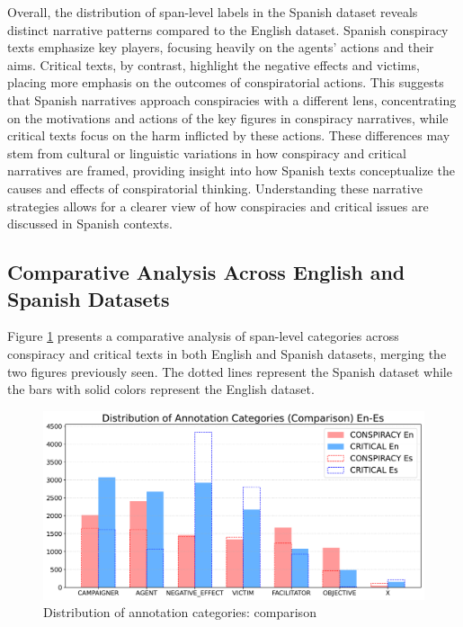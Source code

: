 \documentclass{Configuration_Files/PoliMi3i_thesis}
\begin{document}
Overall, the distribution of span-level labels in the Spanish dataset reveals distinct narrative patterns compared to the English dataset. Spanish conspiracy texts emphasize key players, focusing heavily on the agents' actions and their aims. Critical texts, by contrast, highlight the negative effects and victims, placing more emphasis on the outcomes of conspiratorial actions. This suggests that Spanish narratives approach conspiracies with a different lens, concentrating on the motivations and actions of the key figures in conspiracy narratives, while critical texts focus on the harm inflicted by these actions. These differences may stem from cultural or linguistic variations in how conspiracy and critical narratives are framed, providing insight into how Spanish texts conceptualize the causes and effects of conspiratorial thinking. Understanding these narrative strategies allows for a clearer view of how conspiracies and critical issues are discussed in Spanish contexts.

\subsection{Comparative Analysis Across English and Spanish Datasets} \label{subsec:comparative_analysis_en_es}
Figure \ref{fig:comparison_chart_en_es} presents a comparative analysis of span-level categories across conspiracy and critical texts in both English and Spanish datasets, merging the two figures previously seen. The dotted lines represent the Spanish dataset while the bars with solid colors represent the English dataset.

\begin{figure}[H]
 \centering
 \includegraphics[width=0.95\linewidth]{Images/distrib_annotation_cat_comparison_en_es.pdf}
 \caption{\small Distribution of annotation categories: comparison}
 \label{fig:comparison_chart_en_es}
\end{figure}
\FloatBarrier
\end{document}
